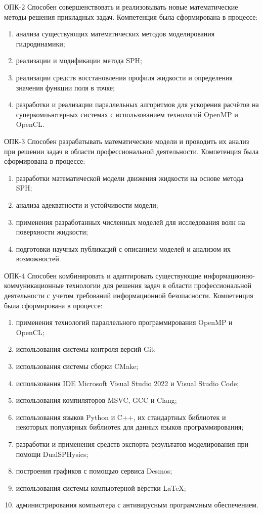 ОПК-2 Способен совершенствовать и реализовывать новые математические методы решения прикладных задач.
Компетенция была сформирована в процессе:
\begin{enumerate}
    \item анализа существующих математических методов моделирования гидродинамики;
    \item реализации и модификации метода SPH;
    \item реализации средств восстановления профиля жидкости и определения значения функции поля в точке;
    \item разработки и реализации параллельных алгоритмов для ускорения расчётов 
        на суперкомпьютерных системах с использованием технологий OpenMP и OpenCL.
\end{enumerate}

ОПК-3 Способен разрабатывать математические модели и проводить их анализ при решении задач в области профессиональной деятельности.
Компетенция была сформирована в процессе:
\begin{enumerate}
    \item разработки математической модели движения жидкости на основе метода SPH;
    \item анализа адекватности и устойчивости модели;
    \item применения разработанных численных моделей для исследования волн на поверхности жидкости;
    \item подготовки научных публикаций с описанием моделей и анализом их возможностей.
\end{enumerate}

ОПК-4 Способен комбинировать и адаптировать существующие информационно-коммуникационные технологии 
для решения задач в области профессиональной деятельности с учетом требований информационной безопасности.
Компетенция была сформирована в процессе:
\begin{enumerate}
    \item применения технологий параллельного программирования OpenMP и OpenCL;
    \item использования системы контроля версий Git;
    \item использования системы сборки CMake;
    \item использования IDE Microsoft Visual Studio 2022 и Visual Studio Code;
    \item использования компиляторов MSVC, GCC и Clang;
    \item использования языков Python и C++, их стандартных библиотек и некоторых популярных библиотек для данных языков программирования;
    \item разработки и применения средств экспорта результатов моделирования при помощи DualSPHysics;
    \item построения графиков с помощью сервиса Desmos;
    \item использования системы компьютерной вёрстки \LaTeX;
    \item администрирования компьютера с антивирусным программным обеспечением.
\end{enumerate}

